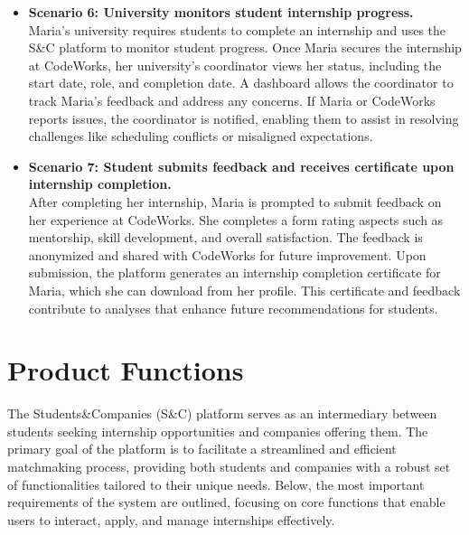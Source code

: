 \begin{itemize}
    \item \textbf{Scenario 6: University monitors student internship progress.} \\
    Maria’s university requires students to complete an internship and uses the S\&C platform to monitor student progress. Once Maria secures the internship at CodeWorks, her university’s coordinator views her status, including the start date, role, and completion date. A dashboard allows the coordinator to track Maria’s feedback and address any concerns. If Maria or CodeWorks reports issues, the coordinator is notified, enabling them to assist in resolving challenges like scheduling conflicts or misaligned expectations.

    \item \textbf{Scenario 7: Student submits feedback and receives certificate upon internship completion.}  \\
    After completing her internship, Maria is prompted to submit feedback on her experience at CodeWorks. She completes a form rating aspects such as mentorship, skill development, and overall satisfaction. The feedback is anonymized and shared with CodeWorks for future improvement. Upon submission, the platform generates an internship completion certificate for Maria, which she can download from her profile. This certificate and feedback contribute to analyses that enhance future recommendations for students.
\end{itemize}

\newpage

\section{Product Functions}

The Students\&Companies (S\&C) platform serves as an intermediary between students seeking internship opportunities and companies offering them. The primary goal of the platform is to facilitate a streamlined and efficient matchmaking process, providing both students and companies with a robust set of functionalities tailored to their unique needs. Below, the most important requirements of the system are outlined, focusing on core functions that enable users to interact, apply, and manage internships effectively.

